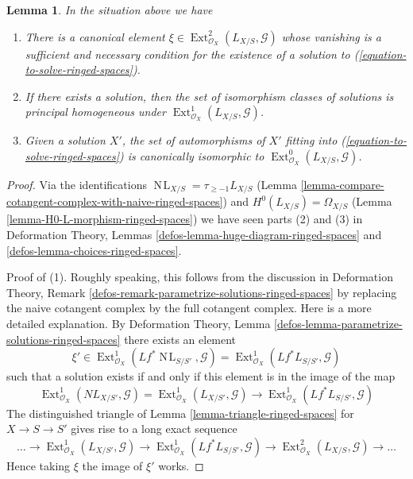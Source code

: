 \documentclass{stacks-project}
\theoremstyle{plain}
\newtheorem{lemma}[subsection]{Lemma}
\theoremstyle{definition}
\theoremstyle{remark}
\numberwithin{equation}{subsection}
\def\Ext{\mathop{\mathrm{Ext}}\nolimits}
\def\NL{\mathop{N\!L}\nolimits}
\begin{document}
\begin{lemma}
\label{lemma-find-obstruction-ringed-spaces}
In the situation above we have
\begin{enumerate}
\item There is a canonical element
$\xi \in \Ext^2_{\mathcal{O}_X}(L_{X/S}, \mathcal{G})$
whose vanishing is a sufficient and necessary condition for the existence
of a solution to (\ref{equation-to-solve-ringed-spaces}).
\item If there exists a solution, then the set of
isomorphism classes of solutions is principal homogeneous under
$\Ext^1_{\mathcal{O}_X}(L_{X/S}, \mathcal{G})$.
\item Given a solution $X'$, the set of automorphisms of $X'$
fitting into (\ref{equation-to-solve-ringed-spaces}) is canonically isomorphic
to $\Ext^0_{\mathcal{O}_X}(L_{X/S}, \mathcal{G})$.
\end{enumerate}
\end{lemma}

\begin{proof}
Via the identifications $\NL_{X/S} = \tau_{\geq -1}L_{X/S}$
(Lemma \ref{lemma-compare-cotangent-complex-with-naive-ringed-spaces})
and
$H^0(L_{X/S}) = \Omega_{X/S}$
(Lemma \ref{lemma-H0-L-morphism-ringed-spaces})
we have seen parts (2) and (3) in
Deformation Theory, Lemmas \ref{defos-lemma-huge-diagram-ringed-spaces} and
\ref{defos-lemma-choices-ringed-spaces}.

\medskip\noindent
Proof of (1). Roughly speaking, this follows from the discussion in
Deformation Theory, Remark
\ref{defos-remark-parametrize-solutions-ringed-spaces}
by replacing the naive cotangent complex by the full cotangent complex.
Here is a more detailed explanation. By
Deformation Theory, Lemma \ref{defos-lemma-parametrize-solutions-ringed-spaces}
there exists an element
$$
\xi' \in
\Ext^1_{\mathcal{O}_X}(Lf^*\NL_{S/S'}, \mathcal{G}) =
\Ext^1_{\mathcal{O}_X}(Lf^*L_{S/S'}, \mathcal{G})
$$
such that a solution exists if and only if this element is in
the image of the map
$$
\Ext^1_{\mathcal{O}_X}(NL_{X/S'}, \mathcal{G}) =
\Ext^1_{\mathcal{O}_X}(L_{X/S'}, \mathcal{G})
\longrightarrow
\Ext^1_{\mathcal{O}_X}(Lf^*L_{S/S'}, \mathcal{G})
$$
The distinguished triangle of Lemma \ref{lemma-triangle-ringed-spaces}
for $X \to S \to S'$ gives rise to a long exact sequence
$$
\ldots \to
\Ext^1_{\mathcal{O}_X}(L_{X/S'}, \mathcal{G}) \to
\Ext^1_{\mathcal{O}_X}(Lf^*L_{S/S'}, \mathcal{G}) \to
\Ext^2_{\mathcal{O}_X}(L_{X/S}, \mathcal{G}) \to \ldots
$$
Hence taking $\xi$ the image of $\xi'$ works.
\end{proof}
\end{document}
